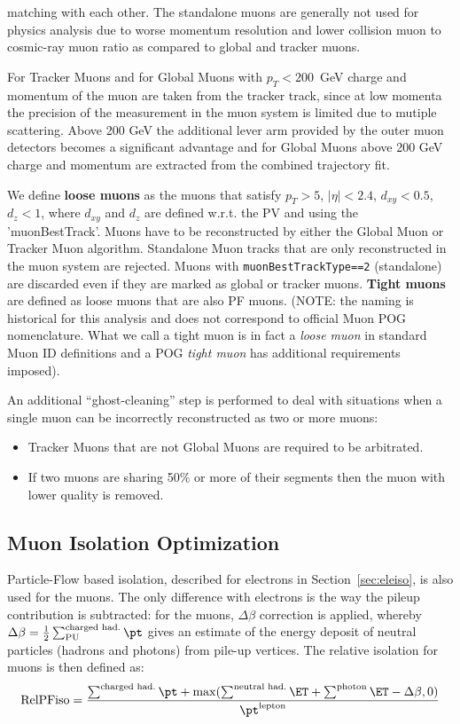    matching with each other. The standalone muons are generally not used for physics analysis due to worse momentum resolution and  lower collision
   muon to cosmic-ray muon ratio as compared to global and tracker muons. 
\par
For Tracker Muons and for Global Muons with $p_T < 200$~GeV
charge and momentum of the muon are taken from the tracker track,
since at low momenta the precision of the measurement
in the muon system is limited due to mutiple scattering.
Above 200 GeV the additional lever arm provided
by the outer muon detectors becomes a significant advantage and
for Global Muons above 200 GeV charge and momentum are extracted from
the combined trajectory fit.
\par
We define {\bf loose muons} as the muons that satisfy  $p_T > 5$, $|\eta| < 2.4$, $d_{xy} < 0.5$, $d_{z} < 1$,
where $d_{xy}$ and $d_{z}$ are defined w.r.t. the PV and using the 'muonBestTrack'.
Muons have to be reconstructed by either the Global Muon or
Tracker Muon algorithm. Standalone Muon tracks that are only reconstructed in the muon system are rejected.
Muons with \verb|muonBestTrackType==2| (standalone) are discarded even if they are marked as global or tracker muons.
{\bf Tight muons} are defined as loose muons that are also PF muons. (NOTE: the naming is historical for this
analysis and does not correspond to official Muon POG nomenclature. What we call a tight muon is in fact a {\it loose muon}
in standard Muon ID definitions and a POG {\it tight muon} has additional requirements imposed).
\par
An additional ``ghost-cleaning'' step is performed to deal with situations when a single muon
can be incorrectly reconstructed as two or more muons:

\begin{itemize}

\item Tracker Muons that are not Global Muons are required to be arbitrated.
\item If two muons are sharing 50\% or more of their segments then the muon with lower quality is removed.

\end{itemize}
\subsection{Muon Isolation Optimization}\label{sec:muoniso}

Particle-Flow based isolation, described for electrons in Section~\ref{sec:eleiso}, is also used for the muons.
The only difference with electrons is the way the pileup contribution is subtracted: for the muons, $\Delta\beta$ correction is 
applied, whereby $\Delta\beta = \frac{1}{2} \sum^\text{charged had.}_\text{PU} \pt$  gives an estimate of the energy deposit of neutral
particles (hadrons and photons) from pile-up vertices.
The relative isolation for muons is then defined as:
\begin{equation}
\text{RelPFiso} = \frac{\sum^\text{charged had.} \pt + \max(\sum^\text{neutral had.} \ET 
+ \sum^\text{photon} \ET - \Delta \beta, 0)}{\pt^\text{lepton}}
\label{eqn:mupfiso}
\end{equation}

